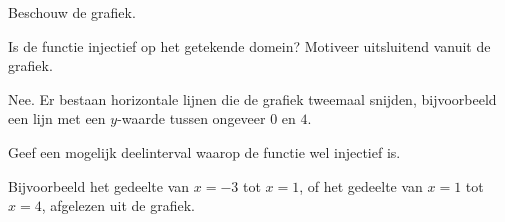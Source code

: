 \documentclass{ximera}
\begin{document}
\begin{oefening}{\oefU\ESS}

Beschouw de grafiek.

\begin{center}
\end{center}

\begin{question}
Is de functie injectief op het getekende domein? Motiveer uitsluitend vanuit de grafiek.

\begin{oplossing}
Nee. Er bestaan horizontale lijnen die de grafiek tweemaal snijden,
bijvoorbeeld een lijn met een \(y\)-waarde tussen ongeveer \(0\) en \(4\).
\end{oplossing}
\end{question}

\begin{question}
Geef een mogelijk deelinterval waarop de functie wel injectief is.

\begin{oplossing}
Bijvoorbeeld het gedeelte van \(x=-3\) tot \(x=1\), of het gedeelte van
\(x=1\) tot \(x=4\), afgelezen uit de grafiek.
\end{oplossing}
\end{question}

\end{oefening}
\end{document}
